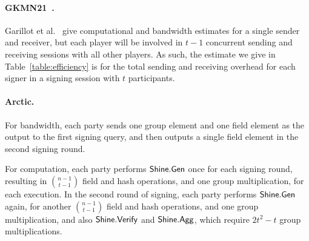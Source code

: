 \paragraph{GKMN21~\cite{GarillotKMN21}.}
Garillot et al.~\cite{GarillotKMN21} give computational and bandwidth estimates for a single sender and receiver,
but each player will be involved in $t-1$ concurrent sending and receiving sessions with all other players.
As such, the estimate we give in Table~\ref{table:efficiency} is for the total sending and receiving overhead for each signer in a signing session with $t$ participants.

\paragraph{Arctic.}
For bandwidth,
each party sends one group element and one field element as the output to the first signing query,
and then outputs a single field element in the second signing round.

For computation,
each party performs $\mathsf{Shine}.\mathsf{Gen}$ once for each signing round,
resulting in ${n-1 \choose t-1}$ field and hash operations, and one
group multiplication, for each execution.
In the second round of signing,
each party performs
$\mathsf{Shine}.\mathsf{Gen}$ again, for another
${n-1 \choose t-1}$ field and hash operations, and one
group multiplication, and also
$\mathsf{Shine}.\mathsf{Verify}$ and $\mathsf{Shine}.\mathsf{Agg}$,
which require $2t^2 -t$ group multiplications.

